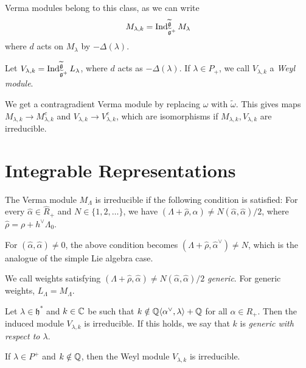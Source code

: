 \begin{example}
  Verma modules belong to this class,
  as we can write
  \[
    M_{\lambda, k}
    = \operatorname{Ind}_{\widetilde{\mathfrak{g}}^+}^{\widetilde{\mathfrak{g}}} M_\lambda
  \]
  where $d$ acts on $M_\lambda$ by
  $-\Delta(\lambda)$.
\end{example}

\begin{example}
  Let $V_{\lambda, k} = \operatorname{Ind}_{\widetilde{\mathfrak{g}}^+}^{\widetilde{\mathfrak{g}}} L_\lambda$,
  where $d$ acts as $-\Delta(\lambda)$.
  If $\lambda \in P_+$, we call $V_{\lambda, k}$
  a \emph{Weyl module}.
\end{example}

\begin{remark}
  We get a contragradient Verma module by
  replacing $\omega$ with $\widetilde{\omega}$.
  This gives maps
  $M_{\lambda, k} \to M_{\lambda, k}^c$ and
  $V_{\lambda, k} \to V_{\lambda, k}^c$,
  which are isomorphisms if
  $M_{\lambda, k}, V_{\lambda, k}$ are
  irreducible.
\end{remark}

\section{Integrable Representations}

\begin{theorem}
  The Verma module $M_\Lambda$ is
  irreducible if the following
  condition is satisfied:
  For every $\widehat{\alpha} \in \widehat{R}_+$
  and $N \in \{1, 2, \dots\}$, we have
  $(\Lambda + \widehat{\rho}, \widehat{\alpha}) \ne N(\widehat{\alpha}, \widehat{\alpha}) / 2$,
  where $\widehat{\rho} = \rho + h^\vee \Lambda_0$.
\end{theorem}

\begin{remark}
  For $(\widehat{\alpha}, \widehat{\alpha}) \ne 0$,
  the above condition becomes
  $(\Lambda + \widehat{\rho}, \widehat{\alpha}^\vee) \ne N$,
  which is the analogue of the
  simple Lie algebra case.
\end{remark}

\begin{remark}
  We call weights satisfying
  $(\Lambda + \widehat{\rho}, \widehat{\alpha}) \ne N(\widehat{\alpha}, \widehat{\alpha}) / 2$
  \emph{generic}.
  For generic weights, $L_\Lambda = M_\Lambda$.
\end{remark}

\begin{theorem}
  Let $\lambda \in \mathfrak{h}^*$ and
  $k \in \mathbb{C}$ be such that
  $k \notin \mathbb{Q} \langle \alpha^\vee, \lambda \rangle + \mathbb{Q}$
  for all $\alpha \in R_+$. Then the
  induced module $V_{\lambda, k}$
  is irreducible.
  If this holds, we say that
  $k$ is \emph{generic with respect to $\lambda$}.
\end{theorem}

\begin{corollary}
  If $\lambda \in P^+$ and
  $k \notin \mathbb{Q}$, then the Weyl module
  $V_{\lambda, k}$
  is irreducible.
\end{corollary}
